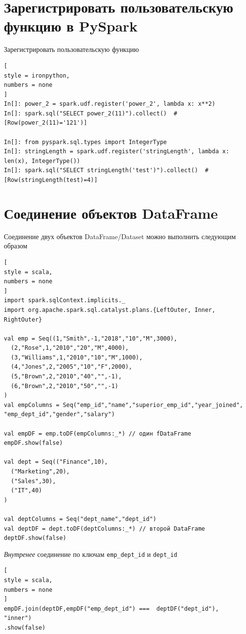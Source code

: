 \documentclass[%
	11pt,
	a4paper,
	utf8,
		]{article}
\begin{document}
\section{Зарегистрировать пользовательскую функцию в PySpark}

Зарегистрировать пользовательскую функцию

\begin{lstlisting}[
style = ironpython,
numbers = none
]
In[]: power_2 = spark.udf.register('power_2', lambda x: x**2)
In[]: spark.sql("SELECT power_2(11)").collect()  # [Row(power_2(11)='121')]

In[]: from pyspark.sql.types import IntegerType
In[]: stringLength = spark.udf.register('stringLength', lambda x: len(x), IntegerType())
In[]: spark.sql("SELECT stringLength('test')").collect()  # [Row(stringLength(test)=4)]
\end{lstlisting}


\section{Соединение объектов DataFrame}

Соединение двух объектов DataFrame/Dataset можно выполнить следующим образом
\begin{lstlisting}[
style = scala,
numbers = none	
]
import spark.sqlContext.implicits._
import org.apache.spark.sql.catalyst.plans.{LeftOuter, Inner, RightOuter}

val emp = Seq((1,"Smith",-1,"2018","10","M",3000),
  (2,"Rose",1,"2010","20","M",4000),
  (3,"Williams",1,"2010","10","M",1000),
  (4,"Jones",2,"2005","10","F",2000),
  (5,"Brown",2,"2010","40","",-1),
  (6,"Brown",2,"2010","50","",-1)
)
val empColumns = Seq("emp_id","name","superior_emp_id","year_joined",
"emp_dept_id","gender","salary")

val empDF = emp.toDF(empColumns:_*) // один fDataFrame
empDF.show(false)

val dept = Seq(("Finance",10),
  ("Marketing",20),
  ("Sales",30),
  ("IT",40)
)

val deptColumns = Seq("dept_name","dept_id")
val deptDF = dept.toDF(deptColumns:_*) // второй DataFrame
deptDF.show(false)
\end{lstlisting}

\emph{Внутренее} соединение по ключам \verb|emp_dept_id| и \verb|dept_id|
\begin{lstlisting}[
style = scala,
numbers = none	
]
empDF.join(deptDF,empDF("emp_dept_id") ===  deptDF("dept_id"), "inner")
.show(false)
\end{lstlisting}
\end{document}
